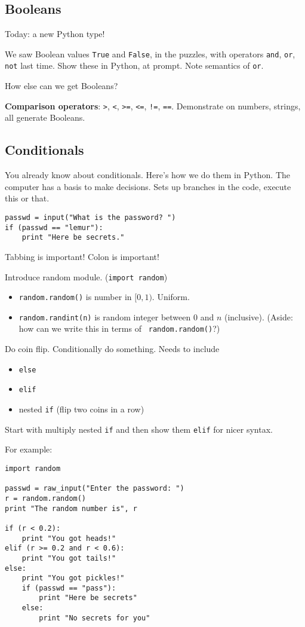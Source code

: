 \documentclass{article}
\begin{document}
\subsection*{Booleans}

Today: a new Python type!

We saw Boolean values {\tt True} and {\tt False}, in the puzzles, with
operators {\tt and}, {\tt or}, {\tt not} last time.  Show these in
Python, at prompt.  Note semantics of {\tt or}.

How else can we get Booleans?

\textbf{Comparison operators}: \verb|>|, \verb|<|, \verb|>=|,
\verb|<=|, \verb|!=|, \verb|==|.  Demonstrate on numbers, strings, all
generate Booleans.

\subsection*{Conditionals}

You already know about conditionals.  Here's how we do them in Python.
The computer has a basis to make decisions.  Sets up branches in the
code, execute this or that.

\begin{verbatim}
passwd = input("What is the password? ")
if (passwd == "lemur"):
    print "Here be secrets."
\end{verbatim}

Tabbing is important!  Colon is important!

Introduce random module. ({\tt import random})
\begin{itemize}
\item {\tt random.random()} is number in $[0,1)$. Uniform.
\item {\tt random.randint(n)} is random integer between $0$ and $n$
  (inclusive).  (Aside: how can we write this in terms of {\tt
    random.random()}?)
\end{itemize}
Do coin flip.  Conditionally do something.  Needs to include
\begin{itemize}
\item {\tt else}
\item {\tt elif}
\item nested {\tt if}  (flip two coins in a row)
\end{itemize}

Start with multiply nested {\tt if} and then show them {\tt elif} for
nicer syntax.

For example:
\begin{verbatim}
import random

passwd = raw_input("Enter the password: ")
r = random.random()
print "The random number is", r

if (r < 0.2):
    print "You got heads!"
elif (r >= 0.2 and r < 0.6):
    print "You got tails!"
else:
    print "You got pickles!"
    if (passwd == "pass"):
        print "Here be secrets"
    else:
        print "No secrets for you"
\end{verbatim}
\end{document}
